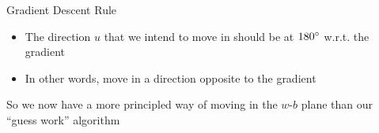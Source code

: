 \begin{frame}
	\begin{overlayarea}{\textwidth}{\textheight}
		
		\begin{block}{Gradient Descent Rule}
			\begin{itemize}\justifying
				\item<1-> The direction $u$ that we intend to move in should be at $180\degree$ w.r.t. the gradient
				\item<2-> In other words, move in a direction opposite to the gradient
			\end{itemize}
		\end{block}
		
		
		 {So we now have a more principled way of moving in the $w$-$b$ plane than our ``guess work'' algorithm}
		
		
	\end{overlayarea}
\end{frame}

